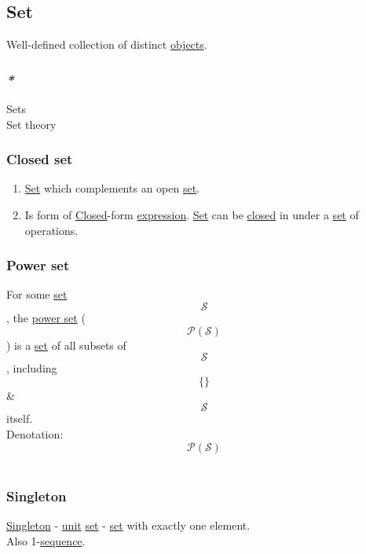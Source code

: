 \documentclass[11pt]{article}
\begin{document}
\subsection{\label{orgbed80ba}Set}
\label{sec:orgce60cc5}
Well-defined collection of distinct \hyperref[orge0f000f]{objects}.\\

\subsubsection{\emph{*}}
\label{sec:org7ac1a40}

\label{org4e7443a}Sets\\
\label{org3257163}Set theory\\

\subsubsection{\label{org0051fd7}Closed set}
\label{sec:orga7a6aea}
\begin{enumerate}
\item \hyperref[orgbed80ba]{Set} which complements an open \hyperref[orgbed80ba]{set}.\\

\item Is form of \hyperref[orgfa67abb]{Closed}-form \hyperref[org667db83]{expression}. \hyperref[orgbed80ba]{Set} can be \hyperref[orgfa67abb]{closed} in under a \hyperref[orgbed80ba]{set} of operations.\\
\end{enumerate}

\subsubsection{\label{org05c8b9e}Power set}
\label{sec:org4827f6f}
For some \hyperref[orgbed80ba]{set} $$ \mathcal{S} $$, the \hyperref[org05c8b9e]{power set} ($$ \mathcal{P(S)} $$) is a \hyperref[orgbed80ba]{set} of all subsets of $$ \mathcal{S} $$, including $$ \{\} $$ \& $$ \mathcal{S} $$ itself.\\

Denotation:\\
$$ \mathcal{P(S)} $$\\

\subsubsection{\label{org2967024}Singleton}
\label{sec:org893386d}
\hyperref[org2967024]{Singleton} - \hyperref[org2833f3f]{unit} \hyperref[orgbed80ba]{set} - \hyperref[orgbed80ba]{set} with exactly one element.\\
Also 1-\hyperref[orgf90a45c]{sequence}.\\
\end{document}
